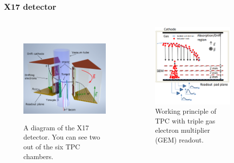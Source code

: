 \documentclass{beamer}
\begin{document}
	\begin{frame}
		\frametitle{X17 detector}
		\begin{columns}
				\begin{figure}
					\centering
					$ $\newline
					\includegraphics[width=0.81\linewidth]{../images/diagram.png}\newline
					\caption{A diagram of the X17 detector. You can see two out of the six TPC chambers.\cite{poster}}
					\label{fig:dia}
				\end{figure}
				\begin{figure}
					\centering
					\includegraphics[width=0.82\linewidth]{../images/diagram2.png}
					\caption{Working principle of TPC with triple gas electron multiplier (GEM) readout.\cite{poster}}
					\label{fig:dia2}
				\end{figure}
		\end{columns}
	\end{frame}
	
\end{document}
